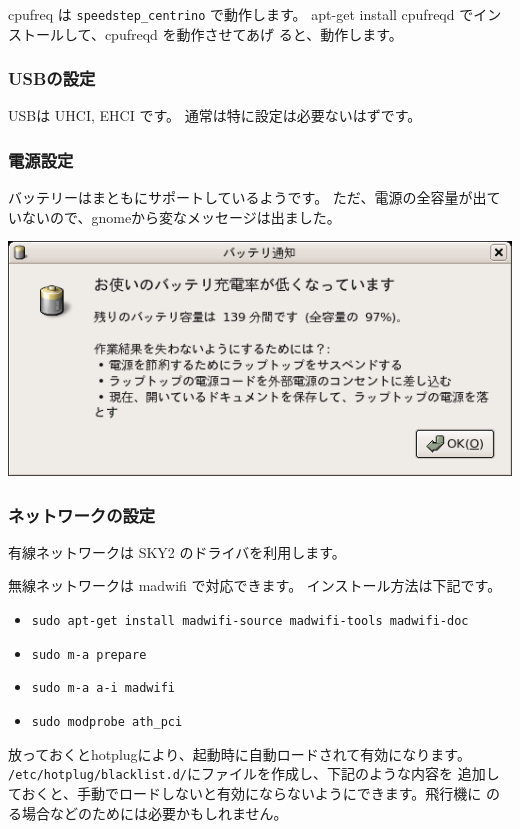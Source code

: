 \documentclass[mingoth,a4paper]{jsarticle}
\begin{document}
cpufreq は \texttt{speedstep\_centrino} で動作します。
apt-get install cpufreqd でインストールして、cpufreqd を動作させてあげ
ると、動作します。

\subsubsection{USBの設定}

USBは UHCI, EHCI です。
通常は特に設定は必要ないはずです。

\subsubsection{電源設定}

バッテリーはまともにサポートしているようです。
ただ、電源の全容量が出ていないので、gnomeから変なメッセージは出ました。

\includegraphics[width=0.8\hsize]{image200607/batterylo.png}

\subsubsection{ネットワークの設定}

有線ネットワークは SKY2 のドライバを利用します。

無線ネットワークは madwifi で対応できます。
インストール方法は下記です。

\begin{itemize}
  \item \texttt{sudo apt-get install madwifi-source madwifi-tools madwifi-doc}
  \item \texttt{sudo m-a prepare}
  \item \texttt{sudo m-a a-i madwifi}
  \item \texttt{sudo modprobe ath\_pci}
\end{itemize}

放っておくとhotplugにより、起動時に自動ロードされて有効になります。
\texttt{/etc/hotplug/blacklist.d/}にファイルを作成し、下記のような内容を
追加しておくと、手動でロードしないと有効にならないようにできます。飛行機に
のる場合などのためには必要かもしれません。
\end{document}
